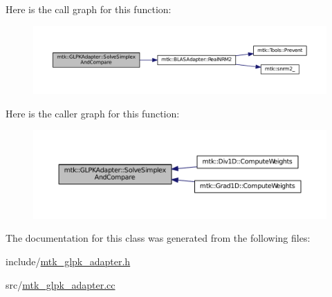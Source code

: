 Here is the call graph for this function\+:\nopagebreak
\begin{figure}[H]
\begin{center}
\leavevmode
\includegraphics[width=350pt]{classmtk_1_1GLPKAdapter_a0c9ebb125445bc5af752bf4fb47f44b2_cgraph}
\end{center}
\end{figure}




Here is the caller graph for this function\+:\nopagebreak
\begin{figure}[H]
\begin{center}
\leavevmode
\includegraphics[width=350pt]{classmtk_1_1GLPKAdapter_a0c9ebb125445bc5af752bf4fb47f44b2_icgraph}
\end{center}
\end{figure}




The documentation for this class was generated from the following files\+:\begin{DoxyCompactItemize}
\item 
include/\hyperlink{mtk__glpk__adapter_8h}{mtk\+\_\+glpk\+\_\+adapter.\+h}\item 
src/\hyperlink{mtk__glpk__adapter_8cc}{mtk\+\_\+glpk\+\_\+adapter.\+cc}\end{DoxyCompactItemize}
